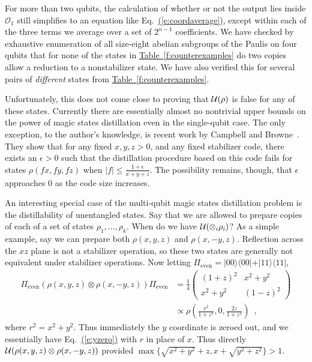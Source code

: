 \documentclass[11pt]{article}
\def\ket #1{\vert #1\rangle}
\def\bra #1{\langle #1\vert}
\def\ketbra #1#2{\ket{#1}\!\bra{#2}}
\def\abs #1{\lvert #1\rvert}
\theoremstyle{note}
\newcommand{\eqnref}[1]{\hyperref[#1]{{(\ref*{#1})}}}
\newcommand{\tabref}[1]{\hyperref[#1]{{Table~\ref*{#1}}}}
\begin{document}
For more than two qubits, the calculation of whether or not the output lies inside $\mathcal O_1$ still simplifies to an equation like Eq.~\eqnref{e:coordaverage}, except within each of the three terms we average over a set of $2^{n-1}$ coefficients.  We have checked by exhaustive enumeration of all size-eight abelian subgroups of the Paulis on four qubits that for none of the states in \tabref{f:counterexamples} do two copies allow a reduction to a nonstabilizer state.  We have also verified this for several pairs of \emph{different} states from \tabref{f:counterexamples}.  

Unfortunately, this does not come close to proving that $\mathcal{U}(\rho)$ is false for any of these states.  Currently there are essentially almost no nontrivial upper bounds on the power of magic states distillation even in the single-qubit case.  The only exception, to the author's knowledge, is recent work by Campbell and Browne~\cite{CampbellBrowne09magic}.  They show that for any fixed $x, y, z > 0$, and any fixed stabilizer code, there exists an $\epsilon > 0$ such that the distillation procedure based on this code fails for states $\rho(f x, f y, f z)$ when $\abs f \leq \frac{1+\epsilon}{x+y+z}$.  The possibility remains, though, that $\epsilon$ approaches $0$ as the code size increases.  

An interesting special case of the multi-qubit magic states distillation problem is the distillability of unentangled states.  Say that we are allowed to prepare copies of each of a set of states $\rho_1, \ldots, \rho_k$.  When do we have $\mathcal{U}(\otimes_i \rho_i)$?  As a simple example, say we can prepare both $\rho(x,y,z)$ and $\rho(x,-y,z)$.  Reflection across the $xz$ plane is not a stabilizer operation, so these two states are generally not equivalent under stabilizer operations.  Now letting $\Pi_{\mathrm{even}} = \ketbra{00}{00} + \ketbra{11}{11}$,
\begin{equation}
\begin{split}
\Pi_{\mathrm{even}} (\rho(x,y,z) \otimes \rho(x,-y,z)) \Pi_{\mathrm{even}}
&= \tfrac{1}{4} \left(\begin{smallmatrix}
(1+z)^2 & x^2+y^2 \\
x^2+y^2       & (1-z)^2
\end{smallmatrix}\right) \\
&\propto \rho(\tfrac{r^2}{1+z^2},0,\tfrac{2z}{1+z^2}) \enspace ,
\end{split}
\end{equation}
where $r^2 = x^2 + y^2$.  Thus immediately the $y$ coordinate is zeroed out, and we essentially have Eq.~\eqnref{e:yzero} with $r$ in place of $x$.  Thus directly $\mathcal{U}(\rho(x,y,z) \otimes \rho(x,-y,z))$ provided $\max\{\sqrt{x^2+y^2}+z, x+\sqrt{y^2+z^2}\} > 1$.
\end{document}
